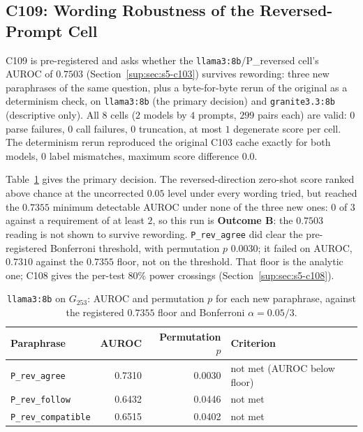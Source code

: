 \subsection{C109: Wording Robustness of the Reversed-Prompt Cell}
\label{sup:sec:s5-c109}

C109 is pre-registered and asks whether the \texttt{llama3:8b}/P\_reversed cell's AUROC of
$0.7503$ (Section~\ref{sup:sec:s5-c103}) survives rewording: three new paraphrases of the same
question, plus a byte-for-byte rerun of the original as a determinism check, on
\texttt{llama3:8b} (the primary decision) and \texttt{granite3.3:8b} (descriptive only). All $8$
cells ($2$ models by $4$ prompts, $299$ pairs each) are valid: $0$ parse failures, $0$ call
failures, $0$ truncation, at most $1$ degenerate score per cell. The determinism rerun reproduced
the original C103 cache exactly for both models, $0$ label mismatches, maximum score difference
$0.0$.

Table~\ref{sup:tab:s5-c109} gives the primary decision. The reversed-direction zero-shot score
ranked above chance at the uncorrected $0.05$ level under every wording tried, but reached the
$0.7355$ minimum detectable AUROC under none of the three new ones: $0$ of $3$ against a requirement
of at least $2$, so this run is \textbf{Outcome B}: the $0.7503$ reading is not shown to survive
rewording. \texttt{P\_rev\_agree} did clear the pre-registered Bonferroni threshold, with
permutation $p$ $0.0030$; it failed on AUROC, $0.7310$ against the $0.7355$ floor, not on the
threshold. That floor is the analytic one; C108 gives the per-test $80\%$ power crossings
(Section~\ref{sup:sec:s5-c108}).

\begin{table}[H]
\caption[C109, primary decision on the new paraphrases]{\texttt{llama3:8b} on $G_{253}$: AUROC
and permutation $p$ for each new paraphrase, against the registered $0.7355$ floor and Bonferroni
$\alpha = 0.05/3$.}
\centering
\begin{tabular}{lrrl}
\toprule
\textbf{Paraphrase} & \textbf{AUROC} & \textbf{Permutation $p$} & \textbf{Criterion} \\
\midrule
\texttt{P\_rev\_agree}      & 0.7310 & 0.0030 & not met (AUROC below floor) \\
\texttt{P\_rev\_follow}     & 0.6432 & 0.0446 & not met \\
\texttt{P\_rev\_compatible} & 0.6515 & 0.0402 & not met \\
\bottomrule
\end{tabular}
\label{sup:tab:s5-c109}
\end{table}

